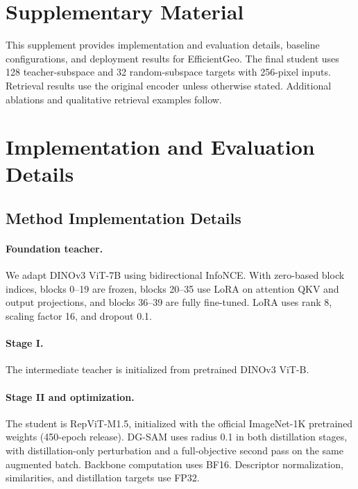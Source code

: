 \clearpage
\nolinenumbers
\appendix
\setcounter{table}{0}
\renewcommand{\thetable}{S\arabic{table}}
\renewcommand{\theHtable}{supp.\arabic{table}}
\setcounter{figure}{0}
\renewcommand{\thefigure}{S\arabic{figure}}
\renewcommand{\theHfigure}{supp.\arabic{figure}}
\setcounter{equation}{0}
\renewcommand{\theequation}{S\arabic{equation}}
\renewcommand{\theHequation}{supp.\arabic{equation}}
\raggedbottom
\section*{Supplementary Material}
This supplement provides implementation and evaluation details, baseline configurations, and deployment results for EfficientGeo. The final student uses 128 teacher-subspace and 32 random-subspace targets with 256-pixel inputs. Retrieval results use the original encoder unless otherwise stated. Additional ablations and qualitative retrieval examples follow.

\section{Implementation and Evaluation Details}
\label{sec:supp-implementation}
\subsection{Method Implementation Details}
\paragraph{Foundation teacher.}
We adapt DINOv3 ViT-7B using bidirectional InfoNCE. With zero-based block indices, blocks 0--19 are frozen, blocks 20--35 use LoRA on attention QKV and output projections, and blocks 36--39 are fully fine-tuned. LoRA uses rank 8, scaling factor 16, and dropout 0.1.

\paragraph{Stage I.}
The intermediate teacher is initialized from pretrained DINOv3 ViT-B.

\paragraph{Stage II and optimization.}
The student is RepViT-M1.5, initialized with the official ImageNet-1K pretrained weights (450-epoch release). DG-SAM uses radius 0.1 in both distillation stages, with distillation-only perturbation and a full-objective second pass on the same augmented batch. Backbone computation uses BF16. Descriptor normalization, similarities, and distillation targets use FP32.

